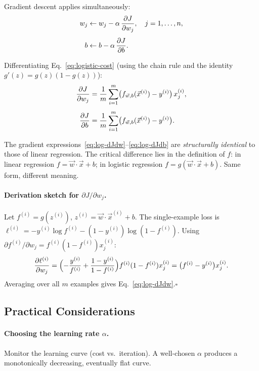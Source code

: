 Gradient descent applies simultaneously:
\begin{align}
w_j&\leftarrow w_j-\alpha\,\dfrac{\partial J}{\partial w_j},\quad j=1,\ldots,n,\\[4pt]
b  &\leftarrow b-\alpha\,\dfrac{\partial J}{\partial b}.
\end{align}

Differentiating Eq.~\eqref{eq:logistic-cost} (using the chain rule and the
identity $g'(z)=g(z)(1-g(z))$):
\begin{align}
\dfrac{\partial J}{\partial w_j}&=\frac{1}{m}\sum_{i=1}^m
\bigl(f_{\vec{w},b}(\vec{x}^{(i)})-y^{(i)}\bigr)\,x_j^{(i)},\label{eq:log-dJdw}\\[4pt]
\dfrac{\partial J}{\partial b}  &=\frac{1}{m}\sum_{i=1}^m
\bigl(f_{\vec{w},b}(\vec{x}^{(i)})-y^{(i)}\bigr).\label{eq:log-dJdb}
\end{align}

\begin{remark}
The gradient expressions~\eqref{eq:log-dJdw}--\eqref{eq:log-dJdb} are
\emph{structurally identical} to those of linear regression. The critical
difference lies in the definition of $f$: in linear regression
$f=\vec{w}\cdot\vec{x}+b$; in logistic regression
$f=g(\vec{w}\cdot\vec{x}+b)$. Same form, different meaning.
\end{remark}

\paragraph{Derivation sketch for $\partial J/\partial w_j$.}
Let $f^{(i)}=g(z^{(i)})$, $z^{(i)}=\vec{w}\cdot\vec{x}^{(i)}+b$.
The single-example loss is
$\ell^{(i)}=-y^{(i)}\log f^{(i)}-(1-y^{(i)})\log(1-f^{(i)})$.
Using $\partial f^{(i)}/\partial w_j=f^{(i)}(1-f^{(i)})x_j^{(i)}$:
\[
\frac{\partial\ell^{(i)}}{\partial w_j}
=\Bigl(-\frac{y^{(i)}}{f^{(i)}}+\frac{1-y^{(i)}}{1-f^{(i)}}\Bigr)
f^{(i)}(1-f^{(i)})x_j^{(i)}
=\bigl(f^{(i)}-y^{(i)}\bigr)x_j^{(i)}.
\]
Averaging over all $m$ examples gives Eq.~\eqref{eq:log-dJdw}.\quad$\square$

\subsection{Practical Considerations}

\paragraph{Choosing the learning rate $\alpha$.}
Monitor the learning curve (cost vs.\ iteration). A well-chosen $\alpha$
produces a monotonically decreasing, eventually flat curve.

